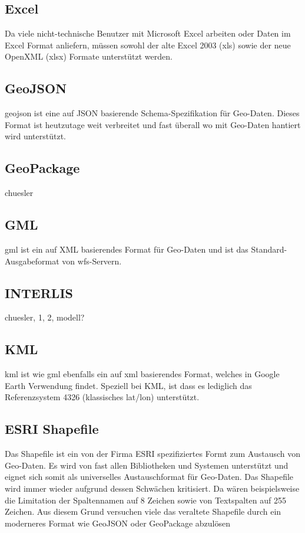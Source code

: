 \subsection{Excel}
Da viele nicht-technische Benutzer mit Microsoft Excel arbeiten\cite{sfkeller} oder Daten im Excel Format anliefern, müssen sowohl der alte Excel 2003 (xls) sowie der neue OpenXML (xlsx) Formate unterstützt werden.

\subsection{GeoJSON}
\gls{geojson} ist eine auf JSON basierende Schema-Spezifikation für Geo-Daten. Dieses Format ist heutzutage weit verbreitet und fast überall wo mit Geo-Daten hantiert wird unterstützt.

\subsection{GeoPackage}
\xxx chuesler

\subsection{GML}
\gls{gml} ist ein auf XML basierendes Format für Geo-Daten und ist das Standard-Ausgabeformat von \acs{wfs}-Servern.


\subsection{INTERLIS}
\xxx chuesler, 1, 2, modell?


\subsection{KML}
\gls{kml} ist wie \gls{gml} ebenfalls ein auf \gls{xml} basierendes Format, welches in Google Earth Verwendung findet. Speziell bei KML, ist dass es lediglich das Referenzsystem 4326 (klassisches lat/lon) unterstützt.


\subsection{ESRI Shapefile}
Das Shapefile ist ein von der Firma ESRI spezifiziertes Formt zum Austausch von Geo-Daten. Es wird von fast allen Bibliotheken und Systemen unterstützt und eignet sich somit als universelles Austauschformat für Geo-Daten. Das Shapefile wird immer wieder aufgrund dessen Schwächen kritisiert. Da wären beispielsweise die Limitation der Spaltennamen auf 8 Zeichen sowie von Textspalten auf 255 Zeichen. Aus diesem Grund versuchen viele das veraltete Shapefile durch ein moderneres Format wie GeoJSON oder GeoPackage abzulösen\cite{sfkeller}

